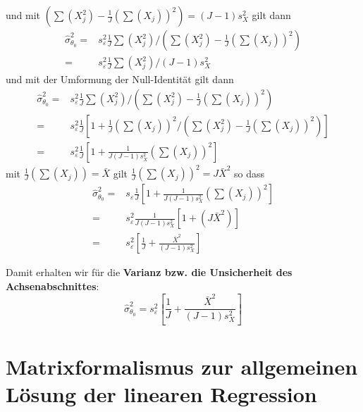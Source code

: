 und mit $(\sum(X_j^2) - \frac{1}{J}(\sum(X_j))^2) = (J-1) s_X^2$ gilt dann
\begin{align}
\hat \sigma^2_{\theta_0} =& 
s^2_{\varepsilon} \frac{1}{J} \sum(X_j^2)  / (\sum(X_j^2) - \frac{1}{J}(\sum(X_j))^2) \\
=& s^2_{\varepsilon} \frac{1}{J} \sum(X_j^2)  / (J-1) s_X^2
\end{align}
und mit der Umformung der Null-Identität gilt dann
\begin{align}
\hat \sigma^2_{\theta_0} 
=& s^2_{\varepsilon} \frac{1}{J} \sum(X_j^2)  / (\sum(X_j^2) - \frac{1}{J}(\sum(X_j))^2) \\
=& s^2_{\varepsilon} \frac{1}{J} \left[ 1 + \frac{1}{J}(\sum(X_j))^2 / (\sum(X_j^2) - \frac{1}{J}(\sum(X_j))^2) \right] \\
=& s^2_{\varepsilon} \frac{1}{J} \left[ 1 + \frac{1}{J(J-1) s_X^2} \left(\sum(X_j)\right)^2 \right]  
\end{align}
mit $\frac{1}{J}(\sum(X_j)) = \bar X$ gilt $\frac{1}{J}(\sum(X_j))^2 = J \bar X^2$
so dass
\begin{align}
\hat \sigma^2_{\theta_0} =& s_{\varepsilon} \frac{1}{J} \left[ 1 + 
\frac{1}{J (J-1) s_X^2} \left(\sum(X_j) \right)^2 \right] \\
=& s^2_{\varepsilon} \frac{1}{J(J-1) s_X^2} \left[ 1 + (J \bar X^2) \right] \\
=&
s^2_{\varepsilon}  \left[\frac{1}{J} + \frac{\bar X^2}{(J-1) s_X^2} \right]
\end{align}

Damit erhalten wir für die \textbf{Varianz bzw. die Unsicherheit des Achsenabschnittes}: 
\begin{equation}
\hat \sigma^2_{\theta_0} =
s^2_{\varepsilon}  \left[ \frac{1}{J} +\frac{\bar {X}^2}{(J - 1) s_X^2 } \right]
\end{equation}

\section{Matrixformalismus zur allgemeinen Lösung der linearen Regression}

